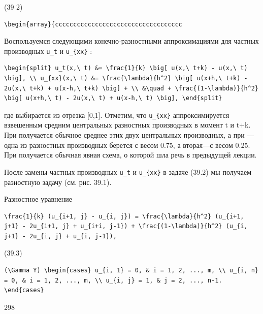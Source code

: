 \documentclass[
  ukrainian,
]{article}
\begin{document}
(39 2)

\begin{verbatim}
\begin{array}{ccccccccccccccccccccccccccccccccccc
\end{verbatim}

Воспользуемся следующими конечно-разностными аппроксимациями для частных
производных \texttt{u\_t} и \texttt{u\_\{xx\}} :

\begin{verbatim}
\begin{split} u_t(x,\ t) &= \frac{1}{k} \big[ u(x,\ t+k) - u(x,\ t) \big], \\ u_{xx}(x,\ t) &= \frac{\lambda}{h^2} \big[ u(x+h,\ t+k) - 2u(x,\ t+k) + u(x-h,\ t+k) \big] + \\ &\quad + \frac{(1-\lambda)}{h^2} \big[ u(x+h,\ t) - 2u(x,\ t) + u(x-h,\ t) \big], \end{split}
\end{verbatim}

где \lambda  выбирается из отрезка {[}0,1{]}. Отметим, что
\texttt{u\_\{xx\}} аппроксимируется взвешенным средним центральных
разностных производных в момент t и t+k. При  получается
обычное среднее этих двух центральных производных, а при 
---одна из разностных производных берется с весом 0.75, а вторая---с
весом 0.25. При  получается обычная явная схема, о которой шла
речь в предыдущей лекции.

После замены частных производных \texttt{u\_t} и \texttt{u\_\{xx\}} в
задаче (39.2) мы получаем разностную задачу (см. рис. 39.1).

Разностное уравнение

\begin{verbatim}
\frac{1}{k} (u_{i+1, j} - u_{i, j}) = \frac{\lambda}{h^2} (u_{i+1, j+1} - 2u_{i+1, j} + u_{i+i, j-1}) + \frac{(1-\lambda)}{h^2} (u_{i, j+1} - 2u_{i, j} + u_{i, j-1}),
\end{verbatim}

(39.3)

\begin{verbatim}
(\Gamma Y) \begin{cases} u_{i, 1} = 0, & i = 1, 2, ..., m, \\ u_{i, n} = 0, & i = 1, 2, ..., m, \\ u_{i, j} = 1, & j = 2, ..., n-1. \end{cases}
\end{verbatim}

298
\end{document}
